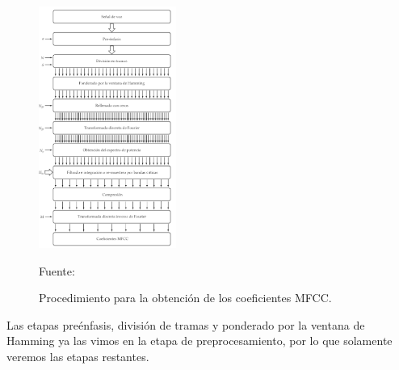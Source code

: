\begin{figure}[ht]
\begin{center}
\includegraphics[width=0.4\textwidth]{Imagenes/Cap2/image039}
\end{center}
\begin{center}
\vskip -0.5cm
\caption{\small{Procedimiento para la obtención de los coeficientes MFCC.}}
\label{fig:figura2.38}
{\small{Fuente: \cite{eyra}}}
\end{center}
\end{figure}
\vskip -0.5cm
Las etapas preénfasis, división de tramas y ponderado por la ventana de Hamming ya las vimos en la etapa de preprocesamiento, por lo que solamente veremos las etapas restantes.
\newpage
